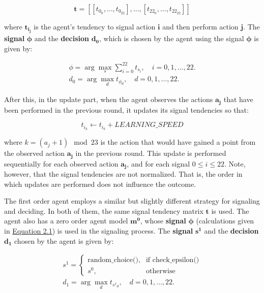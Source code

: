 \[
\mathbf{t} = [[t_{0_{0}}, \ldots, t_{0_{22}}], \ldots, [t_{22_{0}}, \ldots, t_{22_{22}}]]
\]

where $\mathbf{t_{i_{j}}}$ is the agent's tendency to signal action $\mathbf{i}$ and then perform action $\mathbf{j}$. The \textbf{signal} $\mathbf{\phi}$ and the \textbf{decision} $\mathbf{d_0}$, which is chosen by the agent using the signal $\mathbf{\phi}$ is given by: 

\begin{equation}
\label{eq:zero-order-signal}
\begin{aligned}
    \phi = \arg\max_s \sum_{i=0}^{22} t_{s_i}, \quad i = 0, 1, \ldots, 22. \\
    d_0 = \arg\max_d t_{\phi_d}, \quad d = 0, 1, \ldots, 22.
\end{aligned}
\end{equation}

After this, in the update part, when the agent observes the actions $\mathbf{a_j}$ that have been performed in the previous round, it updates its signal tendencies so that:

\begin{equation}
    t_{i_k} \leftarrow t_{i_k} + LEARNING\_SPEED
\end{equation}

where $k = (a_j + 1) \mod 23$ is the action that would have gained a point from the observed action $\mathbf{a_j}$ in the previous round. This update is performed sequentially for each observed action $\mathbf{a_j}$, and for each signal $0 \leq i \leq 22$. Note, however, that the signal tendencies are not normalized. That is, the order in which updates are performed does not influence the outcome. 

The first order agent employs a similar but slightly different strategy for signaling and deciding. In both of them, the same signal tendency matrix $\mathbf{t}$ is used. The agent also has a zero order agent model $\mathbf{m^0}$, whose \textbf{signal} $\mathbf{\phi}$ (calculations given in \hyperref[eq:zero-order-signal]{Equation 2.1}) is used in the  signaling process. The \textbf{signal} $\mathbf{s^1}$ and the \textbf{decision} $\mathbf{d_1}$ chosen by the agent is given by:

\begin{equation*}
\begin{aligned}
    s^1 = \begin{cases}
        \text{{random\_choice()}}, & \text{{if }} \text{{check\_epsilon()}} \\
        s^0, & \text{{otherwise}}
    \end{cases} \\
    d_1 = \arg\max_d t_{{s^1}_d}, \quad d = 0, 1, \ldots, 22. \qquad
\end{aligned}
\end{equation*}

